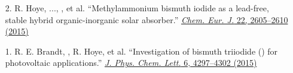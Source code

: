 \begin{enumerate}
        \item[2.] R. Hoye, ..., \myname, et al. ``Methylammonium bismuth iodide as a lead-free, stable hybrid organic-inorganic solar absorber.'' \href{http://doi.wiley.com/10.1002/chem.201505055}{\textit{Chem. Eur. J.} 22, 2605--2610 (2015)}

        \item[1.] R. E. Brandt, \myname, R. Hoye, et al. ``Investigation of bismuth triiodide () for photovoltaic applications.'' \href{https://pubs.acs.org/doi/full/10.1021/acs.jpclett.5b02022}{\textit{J. Phys. Chem. Lett.} 6, 4297--4302 (2015)}
\end{enumerate}


